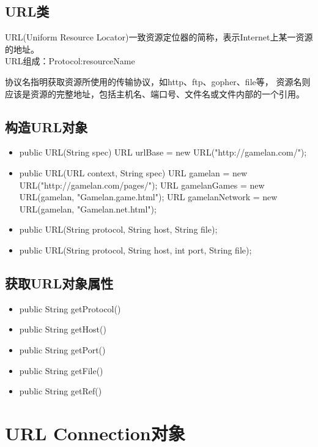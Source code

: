 \subsection{URL类}
\noindent URL(Uniform Resource Locator)一致资源定位器的简称，表示Internet上某一资源的地址。
\\ URL组成：Protocol:resourceName
\par 协议名指明获取资源所使用的传输协议，如http、ftp、gopher、file等，
资源名则应该是资源的完整地址，包括主机名、端口号、文件名或文件内部的一个引用。
\subsection{构造URL对象}
\begin{itemize}
	\item public URL(String spec)
	\subitem URL urlBase = new URL("http://gamelan.com/");
	\item public URL(URL context, String spec)
	\subitem URL gamelan = new URL("http://gamelan.com/pages/");
	\subitem URL gamelanGames = new URL(gamelan, "Gamelan.game.html");
	\subitem URL gamelanNetwork = new URL(gamelan, "Gamelan.net.html");
	\item public URL(String protocol, String host, String file);
	\item public URL(String protocol, String host, int port, String file);
\end{itemize}
\subsection{获取URL对象属性}
\begin{itemize}
	\item public String getProtocol()
	\item public String getHost()
	\item public String getPort()
	\item public String getFile()
	\item public String getRef()
\end{itemize}
\section{URL Connection对象}
